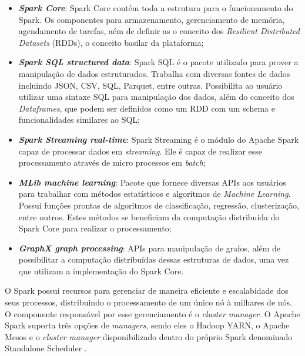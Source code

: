 \begin{itemize}
 \item \textbf{\textit{Spark Core}}: Spark Core contém toda a estrutura para o funcionamento do Spark. Os componentes para armazenamento, gerenciamento de memória, agendamento de tarefas, aém de definir as o conceito dos \textit{Resilient Distributed Datasets} (RDDs), o conceito basilar da plataforma; 
 \item \textbf{\textit{Spark SQL structured data}}: Spark SQL é o pacote utilizado para prover a manipulação de dados estruturados. Trabalha com diversas fontes de dados incluindo JSON, CSV, SQL, Parquet, entre outras. Possibilita ao usuário utilizar uma sintaxe SQL para manipulação dos dados, além do conceito dos \textit{Dataframes}, que podem ser definidos como um RDD com um schema e funcionalidades similares ao SQL;
 \item \textbf{\textit{Spark Streaming real-time}}: Spark Streaming é o módulo do Apache Spark capaz de processar dados em \textit{streaming}. Ele é capaz de realizar esse processamento através de micro processos em \textit{batch};
 \item \textbf{\textit{MLib machine learning}}: Pacote que fornece diversas APIs aos usuários para trabalhar com métodos estatísticos e algoritmos de \textit{Machine Learning}. Possui funções prontas de algoritmos de classificação, regressão, clusterização, entre outros. Estes métodos se beneficiam da computação distribuída do Spark Core para realizar o processamento;
 \item \textbf{\textit{GraphX graph processing}}: APIs para manipulação de grafos, além de possibilitar a computação distribuídas dessas estruturas de dados, uma vez que utilizam a implementação do Spark Core.
 \end{itemize}
 
O Spark possui recursos para gerenciar de maneira eficiente e escalabidade dos seus processos, distribuindo o processamento de um único nó à milhares de nós. O componente responsável por esse gerenciamento é o \textit{cluster manager}. O Apache Spark suporta três opções de \textit{managers}, sendo eles o Hadoop YARN, o Apache Mesos e o \textit{cluster manager} disponibilizado dentro do próprio Spark denominado Standalone Scheduler \cite{learningspark}.
 
